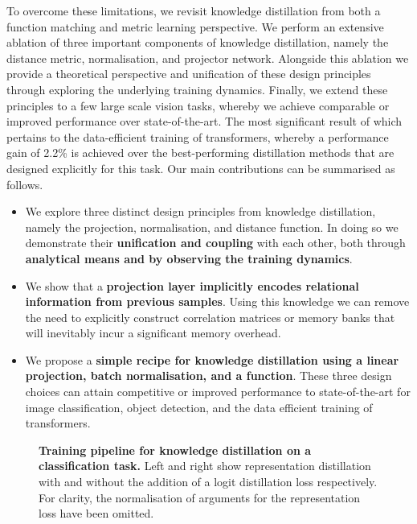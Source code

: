 \documentclass[letterpaper]{article} \usepackage[submission]{aaai23}  \usepackage{times}  \usepackage{helvet}  \usepackage{courier}  \usepackage[hyphens]{url}  \usepackage{graphicx} \urlstyle{rm} \def\UrlFont{\rm}  \usepackage{natbib}  \usepackage{caption} \frenchspacing  \setlength{\pdfpagewidth}{8.5in} \setlength{\pdfpageheight}{11in} \usepackage{algorithm}
\begin{document}
To overcome these limitations, we revisit knowledge distillation from both a function matching and metric learning perspective. We perform an extensive ablation of three important components of knowledge distillation, namely the distance metric, normalisation, and projector network. Alongside this ablation we provide a theoretical perspective and unification of these design principles through exploring the underlying training dynamics. Finally, we extend these principles to a few large scale vision tasks, whereby we achieve comparable or improved performance over state-of-the-art. The most significant result of which pertains to the data-efficient training of transformers, whereby a performance gain of 2.2\% is achieved over the best-performing distillation methods that are designed explicitly for this task.
Our main contributions can be summarised as follows.
\begin{itemize}
    \item We explore three distinct design principles from knowledge distillation, namely the projection, normalisation, and distance function. In doing so we demonstrate their \textbf{unification and coupling} with each other, both through \textbf{analytical means and by observing the training dynamics}.
    \item We show that a \textbf{projection layer implicitly encodes relational information from previous samples}. Using this knowledge we can remove the need to explicitly construct correlation matrices or memory banks that will inevitably incur a significant memory overhead.
    \item We propose a \textbf{simple recipe for knowledge distillation using a linear projection, batch normalisation, and a  function}. These three design choices can attain competitive or improved performance to state-of-the-art for image classification, object detection, and the data efficient training of transformers. 
\end{itemize}



\begin{figure}[ht]
    \centering
    \caption{\textbf{Training pipeline for knowledge distillation on a classification task.} Left and right show representation distillation with and without the addition of a logit distillation loss respectively. For clarity, the normalisation of arguments for the representation loss  have been omitted.}
    \label{fig:distillation_overview}
\end{figure}
\end{document}
